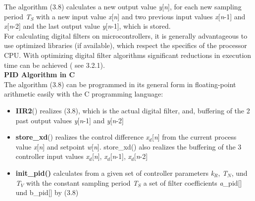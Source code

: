 The algorithm (3.8) calculates a new output value \textit{y}[\textit{n}], for each new sampling period \textit{T${}_{S}$} with a new input value \textit{x}[\textit{n}] and two previous input values \textit{x}[\textit{n}-1] and \textit{x}[\textit{n}-2] and the last output value \textit{y}[\textit{n}-1], which is stored.\\

For calculating digital filters on microcontrollers, it is generally advantageous to use optimized libraries (if available), which respect the specifics of the processor CPU. With optimizing digital filter algorithms significant reductions in execution time can be achieved ( see 3.2.1).\\

{\rot\bf PID Algorithm in C }\\

The algorithm (3.8) can be programmed in its general form in floating-point arithmetic easily with the C programming language:

\begin{itemize}
\item  \textbf{IIR2}() realizes (3.8), which is the actual digital filter, and, buffering of the 2 past output values \textit{y}[\textit{n}-1] and \textit{y}[\textit{n}-2]

\item  \textbf{store\_xd}() realizes the control difference \textit{x${}_{d}$}[\textit{n}] from the current process value \textit{x}[\textit{n}] and setpoint \textit{w}[\textit{n}]. store\_xd() also realizes the buffering of the 3 controller input values \textit{x${}_{d}$}[\textit{n}], \textit{x${}_{d}$}[\textit{n}-1], \textit{x${}_{d}$}[\textit{n}-2]

\item  \textbf{init\_pid()} calculates from a given set of controller parameters \textit{k${}_{R}$}, \textit{T${}_{N}$}, und \textit{T${}_{V}$} with the constant sampling period \textit{T${}_{S}$} a set of filter coefficients \textit{a\_}pid[] und  b\_pid[] by (3.8)
\end{itemize}

